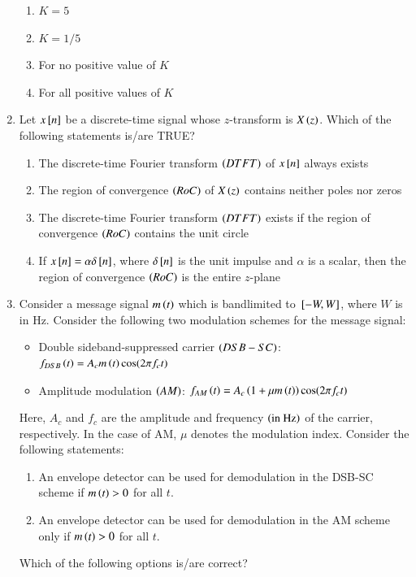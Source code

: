 \documentclass[journal,12pt,onecolumn]{IEEEtran}
\theoremstyle{remark}
\begin{document}
\begin{enumerate}
\hfill{}
\begin{multicols}{2}
\begin{enumerate}
\item $K = 5$
\item $K = 1/5$
\item For no positive value of $K$
\item For all positive values of $K$
\end{enumerate}
\end{multicols}


\item Let $x{}\left[n\right]$ be a discrete-time signal whose $z$-transform is $X\left(z\right)$. Which of the following statements is/are TRUE?

\hfill{}

\begin{enumerate}
\item The discrete-time Fourier transform $\left(DTFT\right)$ of $x{}\left[n\right]$ always exists
\item The region of convergence $\left(RoC\right)$ of $X\left(z\right)$ contains neither poles nor zeros
\item The discrete-time Fourier transform $\left(DTFT\right)$ exists if the region of convergence $\left(RoC\right)$ contains the unit circle
\item If $x{}\left[n\right] = \alpha\delta{}\left[n\right]$, where $\delta{}\left[n\right]$ is the unit impulse and $\alpha$ is a scalar, then the region of convergence $\left(RoC\right)$ is the entire $z$-plane
\end{enumerate}

\item Consider a message signal $m\left(t\right)$ which is bandlimited to ${}\left[-W, W\right]$, where $W$ is in Hz. Consider the following two modulation schemes for the message signal:
\begin{itemize}
    \item Double sideband-suppressed carrier $\left(DSB-SC\right)$: $f_{DSB}\left(t\right) = A_c m\left(t\right) \cos(2\pi f_c t)$
    \item Amplitude modulation $\left(AM\right)$: $f_{AM}\left(t\right) = A_c \left(1 + \mu m\left(t\right)\right) \cos(2\pi f_c t)$
\end{itemize}
Here, $A_c$ and $f_c$ are the amplitude and frequency $\left(\text{in Hz}\right)$ of the carrier, respectively. In the case of AM, $\mu$ denotes the modulation index. Consider the following statements:
\begin{enumerate}[label=(\roman*.)]
    \item An envelope detector can be used for demodulation in the DSB-SC scheme if $m\left(t\right) > 0$ for all $t$.
    \item An envelope detector can be used for demodulation in the AM scheme only if $m\left(t\right) > 0$ for all $t$.
\end{enumerate}
Which of the following options is/are correct?


\end{enumerate}
\end{document}

